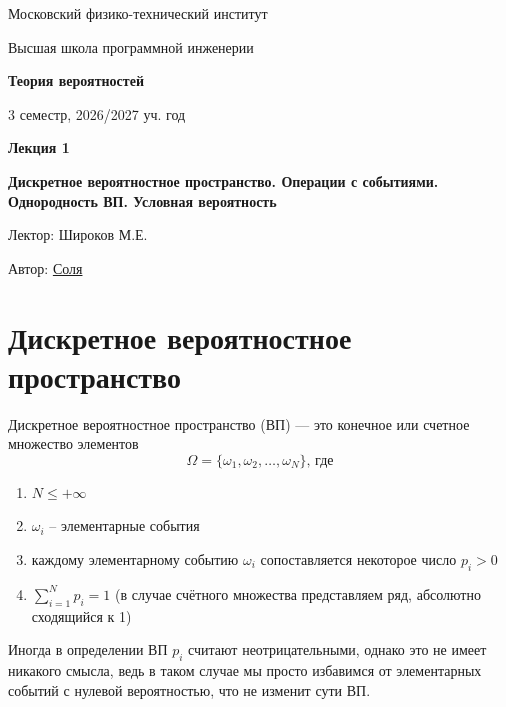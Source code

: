 \documentclass[11pt]{article}
\newcommand{\lectureNumber}{1}
\newcommand{\lectureTitle}{Дискретное вероятностное пространство. Операции с событиями. Однородность ВП. Условная вероятность}
\newcommand{\courseName}{Теория вероятностей}
\newcommand{\semester}{3 семестр, 2026/2027 уч. год}
\begin{document}
\begin{titlepage}
    \centering
    
    {\large Московский физико-технический институт \par}
    {\large Высшая школа программной инженерии \par}
    \vspace{2cm}

    {\Large \textbf{\courseName} \par}
    {\large \semester \par}
    
    \vspace*{\fill}

    {\Huge \textbf{Лекция \lectureNumber} \par}
    {\Huge \textbf{\lectureTitle} \par}
    
    \vspace*{\fill}
    
    {\large Лектор: Широков М.Е. \par}
    {\large Автор: \href{t.me/sol_m_07}{Соля} \par}

\end{titlepage}


\section{Дискретное вероятностное пространство}

\begin{definition}
  Дискретное вероятностное пространство (ВП) — это конечное или счетное множество элементов
  \[\Omega = \{ \omega_1, \omega_2, \ldots, \omega_N \} \text{, где}\]
  \begin{enumerate}
    \item $N \leq + \infty$
    \item $\omega_i$ -- элементарные события
    \item каждому элементарному событию $\omega_i$ сопоставляется некоторое число $p_i > 0$
    \item $\displaystyle \sum_{i=1}^{N} p_i = 1$ (в случае счётного множества представляем ряд, абсолютно сходящийся к 1)
  \end{enumerate}
\end{definition}

\begin{remark}
  Иногда в определении ВП $p_i$ считают неотрицательными, 
  однако это не имеет никакого смысла, ведь в таком случае 
  мы просто избавимся от элементарных событий с нулевой 
  вероятностью, что не изменит сути ВП.
\end{remark}
\end{document}
